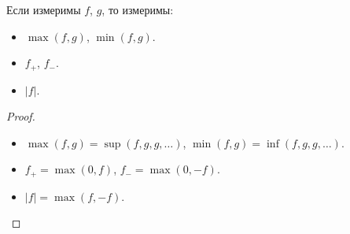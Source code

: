\begin{corollary}
	Если измеримы $f$, $g$, то измеримы:
	\begin{itemize}
		\item $\max(f, g)$, $\min(f, g)$.
		\item $f_{+}$, $f_{-}$.
		\item $|f|$.
	\end{itemize}
\end{corollary}
\begin{proof}
	\enewline
	\begin{itemize}
		\item $\max(f, g) = \sup(f, g, g, \ldots)$, $\min(f, g) = \inf(f, g, g, \ldots)$.
		\item $f_{+} = \max(0, f)$, $f_{-} = \max(0, -f)$.
		\item $|f| = \max(f, -f)$.
	\end{itemize}
\end{proof}
